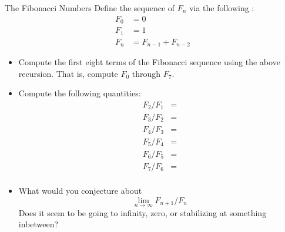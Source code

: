 \begin{exercise}{The Fibonacci Numbers \Coffeecup \Coffeecup}\label{Fibbies}
Define the sequence of  $F_n$ via the following :
\begin{align*}
 F_0 &= 0 \\
 F_1 &= 1 \\
 F_n &=F_{n-1}+F_{n-2}
\end{align*}
\begin{itemize}

\item Compute the first eight terms of the Fibonacci sequence using the above recursion.  That is, compute $F_0$ through $F_7$. 


\item Compute the following quantities:
\begin{align*}
F_2/F_1&=\\
F_3/F_2&=\\
F_4/F_3&=\\
F_5/F_4&=\\
F_6/F_5&=\\
F_7/F_6&=\\
\end{align*}


\item What would you conjecture about $$\lim_{n \rightarrow \infty} F_{n+1}/F_n$$ Does it seem to be going to infinity, zero, or stabilizing at something inbetween?
\end{itemize}

\end{exercise}

